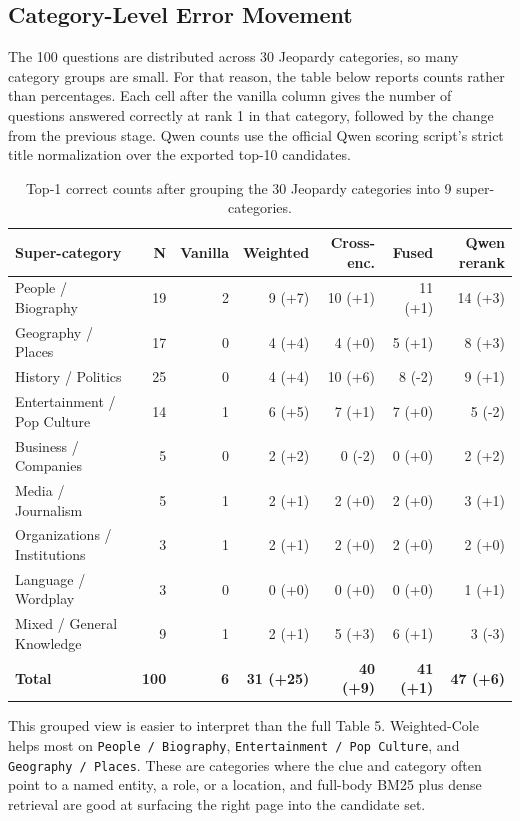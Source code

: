 \documentclass[11pt]{article}
\begin{document}
\subsection{Category-Level Error Movement}

The 100 questions are distributed across 30 Jeopardy categories, so many category groups are small. For that reason, the table below reports counts rather than percentages. Each cell after the vanilla column gives the number of questions answered correctly at rank 1 in that category, followed by the change from the previous stage. Qwen counts use the official Qwen scoring script's strict title normalization over the exported top-10 candidates.

\begin{table}[h]
\centering
\scriptsize
\begin{tabular}{lrrrrrr}
\toprule
Super-category & N & Vanilla & Weighted & Cross-enc. & Fused & Qwen rerank \\
\midrule
People / Biography & 19 & 2 & 9 (+7) & 10 (+1) & 11 (+1) & 14 (+3) \\
Geography / Places & 17 & 0 & 4 (+4) & 4 (+0) & 5 (+1) & 8 (+3) \\
History / Politics & 25 & 0 & 4 (+4) & 10 (+6) & 8 (-2) & 9 (+1) \\
Entertainment / Pop Culture & 14 & 1 & 6 (+5) & 7 (+1) & 7 (+0) & 5 (-2) \\
Business / Companies & 5 & 0 & 2 (+2) & 0 (-2) & 0 (+0) & 2 (+2) \\
Media / Journalism & 5 & 1 & 2 (+1) & 2 (+0) & 2 (+0) & 3 (+1) \\
Organizations / Institutions & 3 & 1 & 2 (+1) & 2 (+0) & 2 (+0) & 2 (+0) \\
Language / Wordplay & 3 & 0 & 0 (+0) & 0 (+0) & 0 (+0) & 1 (+1) \\
Mixed / General Knowledge & 9 & 1 & 2 (+1) & 5 (+3) & 6 (+1) & 3 (-3) \\
\midrule
\textbf{Total} & \textbf{100} & \textbf{6} & \textbf{31 (+25)} & \textbf{40 (+9)} & \textbf{41 (+1)} & \textbf{47 (+6)} \\
\bottomrule
\end{tabular}
\caption{Top-1 correct counts after grouping the 30 Jeopardy categories into 9 super-categories.}
\end{table}

This grouped view is easier to interpret than the full Table 5. Weighted-Cole helps most on \texttt{People / Biography}, \texttt{Entertainment / Pop Culture}, and \texttt{Geography / Places}. These are categories where the clue and category often point to a named entity, a role, or a location, and full-body BM25 plus dense retrieval are good at surfacing the right page into the candidate set.
\end{document}
